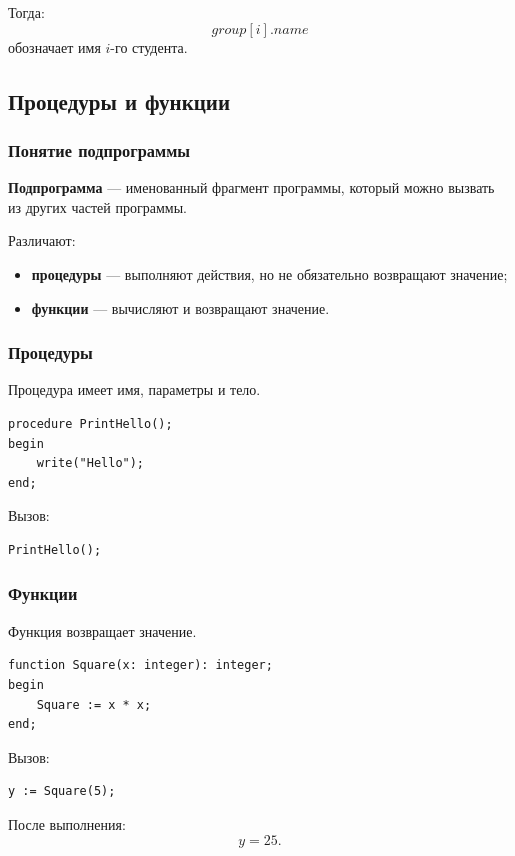 \documentclass[12pt,a4paper]{article}
\begin{document}
Тогда:
\[
    group[i].name
\]
обозначает имя $i$-го студента.

\subsection{Процедуры и функции}

\subsubsection{Понятие подпрограммы}

\textbf{Подпрограмма} --- именованный фрагмент программы, который можно вызвать из других частей программы.

Различают:
\begin{itemize}
    \item \textbf{процедуры} --- выполняют действия, но не обязательно возвращают значение;
    \item \textbf{функции} --- вычисляют и возвращают значение.
\end{itemize}

\subsubsection{Процедуры}

Процедура имеет имя, параметры и тело.

\begin{verbatim}
procedure PrintHello();
begin
    write("Hello");
end;
\end{verbatim}

Вызов:

\begin{verbatim}
PrintHello();
\end{verbatim}

\subsubsection{Функции}

Функция возвращает значение.

\begin{verbatim}
function Square(x: integer): integer;
begin
    Square := x * x;
end;
\end{verbatim}

Вызов:

\begin{verbatim}
y := Square(5);
\end{verbatim}

После выполнения:
\[
    y = 25.
\]
\end{document}

